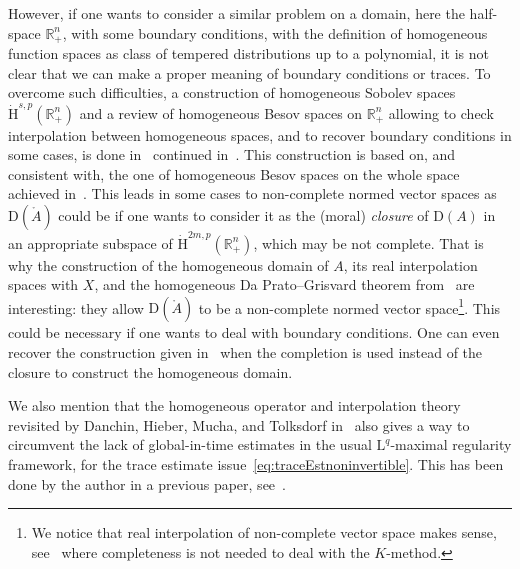 \documentclass[AHL,Unicode,longabstracts,published]{cedram}
\newcommand{\bbR}{\mathbb{R}}
\newcommand{\rmH}{\mathrm{H}}%
\newcommand{\rmD}{\mathrm{D}}
\newcommand{\rmL}{\mathrm{L}}
\newcommand{\rgA}{\mathring{A}}
\begin{document}
However, if one wants to consider a similar problem on a domain, here the half-space $\bbR^n_+$, with some boundary conditions, with the definition of homogeneous function spaces as class of tempered distributions up to a polynomial, it is not clear that we can make a proper meaning of boundary conditions or traces. To overcome such difficulties, a construction of homogeneous Sobolev spaces $\dot{\rmH}^{s,p}(\bbR^n_+)$ and a review of homogeneous Besov spaces on $\bbR^n_+$ allowing to check interpolation between homogeneous spaces, and to recover boundary conditions in some cases, is done in~\cite[Chapters~3~\&~4]{DanchinHieberMuchaTolk2020} continued in~\cite{Gaudin2022}. This construction is based on, and consistent with, the one of homogeneous Besov spaces on the whole space achieved in~\cite[Chapter~2]{bookBahouriCheminDanchin}. This leads in some cases to non-complete normed vector spaces as $\rmD(\rgA)$ could be if one wants to consider it as the (moral) \emph{closure} of $\rmD(A)$ in an appropriate subspace of $\dot{\rmH}^{2m,p}(\bbR^n_+)$, which may be not complete. That is why the construction of the homogeneous domain of $A$, its real interpolation spaces with $X$, and the homogeneous Da Prato--Grisvard theorem from~\cite[Chapter~2]{DanchinHieberMuchaTolk2020} are interesting: they allow $\rmD(\rgA)$ to be a non-complete normed vector space\footnote{We notice that real interpolation of non-complete vector space makes sense, see~\cite[Chapter~3]{BerghLofstrom1976} where completeness is not needed to deal with the $K$-method.}. This could be necessary if one wants to deal with boundary conditions. One can even recover the construction given in~\cite[Chapter~6]{bookHaase2006} when the completion is used instead of the closure to construct the homogeneous domain.

We also mention that the homogeneous operator and interpolation theory revisited by Danchin, Hieber, Mucha, and Tolksdorf in~\cite[Chapter~2]{DanchinHieberMuchaTolk2020} also gives a way to circumvent the lack of global-in-time estimates in the usual $\rmL^q$-maximal regularity framework, for the trace estimate issue~\eqref{eq:traceEstnoninvertible}. This has been done by the author in a previous paper, see~\cite[Sections~1,~2\&~4]{Gaudin2023}.
\end{document}
